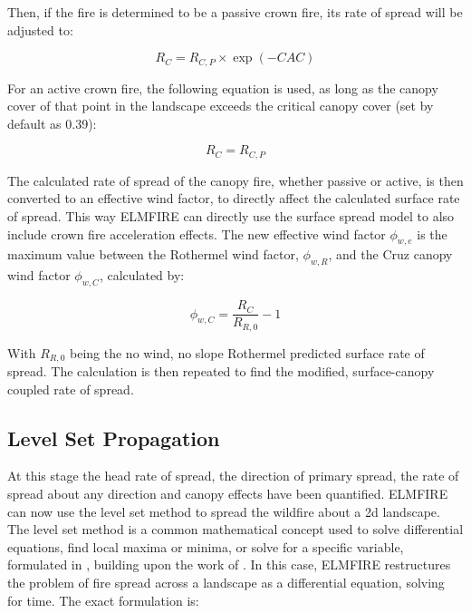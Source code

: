 Then, if the fire is determined to be a passive crown fire, its rate of spread will be adjusted to:

\begin{equation*}
    R_C=R_{C,P}\times \exp{\left(-CAC\right)}
\end{equation*}

For an active crown fire, the following equation is used, as long as the canopy cover of that point in the landscape exceeds the critical canopy cover (set by default as 0.39):

\begin{equation*}
    R_C=R_{C,P}
\end{equation*}

The calculated rate of spread of the canopy fire, whether passive or active, is then converted to an effective wind factor, to directly affect the calculated surface rate of spread. This way ELMFIRE can directly use the surface spread model to also include crown fire acceleration effects. The new effective wind factor $\phi_{w,e}$ is the maximum value between the Rothermel wind factor, $\phi_{w,R}$, and the Cruz canopy wind factor $\phi_{w,C}$, calculated by:

\begin{equation*}
    \phi_{w,C} = \frac{R_C}{R_{R,0}}-1
\end{equation*}

With ${R_{R,0}}$ being the no wind, no slope Rothermel predicted surface rate of spread. The calculation is then repeated to find the modified, surface-canopy coupled rate of spread. 

\subsection{Level Set Propagation}

At this stage the head rate of spread, the direction of primary spread, the rate of spread about any direction and canopy effects have been quantified. ELMFIRE can now use the level set method to spread the wildfire about a 2d landscape. The level set method is a common mathematical concept used to solve differential equations, find local maxima or minima, or solve for a specific variable, formulated in \cite{lautenbergerWildlandFireModeling2013}, building upon the work of \cite{rehmFirefrontPropagationUsing2009}. In this case, ELMFIRE restructures the problem of fire spread across a landscape as a differential equation, solving for time. The exact formulation is:

